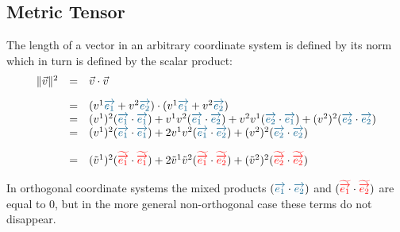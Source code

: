 \subsection{Metric Tensor}

The length of a vector in an arbitrary coordinate system is defined by its norm which in
turn is defined by the scalar product:
\begin{equation}
    \begin{array}{rcl}
        \|\vec{v}\|^2 & = & \vec{v} \cdot \vec{v} \\
        \noalign{\vskip10pt}
        & = & (v^1 \hdbv{1} + v^2 \hdbv{2}) \cdot (v^1 \hdbv{1} + v^2 \hdbv{2}) \\ 
        & = & (v^1)^2(\hdbv{1}\cdot\hdbv{1}) + v^1 v^2 (\hdbv{1}\cdot\hdbv{2}) +
               v^2 v^1 (\hdbv{2}\cdot\hdbv{1}) +(v^2)^2(\hdbv{2}\cdot\hdbv{2}) \\
        & = & (v^1)^2(\hdbv{1}\cdot\hdbv{1}) + 2 v^1 v^2 (\hdbv{1}\cdot\hdbv{2}) +
              (v^2)^2(\hdbv{2}\cdot\hdbv{2}) \\
        \noalign{\vskip10pt}
        & = & (\tilde{v}^1)^2(\hdbtv{1}\cdot\hdbtv{1}) + 2 \tilde{v}^1 \tilde{v}^2 (\hdbtv{1}\cdot\hdbtv{2}) +
              (\tilde{v}^2)^2(\hdbtv{2}\cdot\hdbtv{2})              
    \end{array}
\end{equation}

In orthogonal coordinate systems the mixed products $(\hdbv{1}\cdot\hdbv{2})$ and
$(\textcolor{red}{\widetilde{\overrightarrow{e_{1}}}}\cdot\textcolor{red}{\widetilde{\overrightarrow{e_{2}}}})$ are equal to $0$, but in the more general non-orthogonal case
these terms do not disappear. \\

